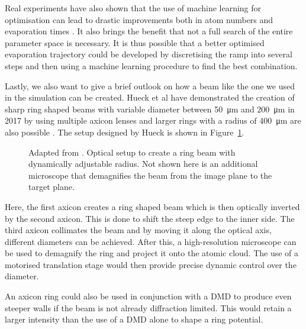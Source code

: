 Real experiments have also shown that the use of machine learning for optimisation can lead to drastic improvements both in atom numbers and evaporation times \cite{machinelearning1,machinelearning2}. It also brings the benefit that not a full search of the entire parameter space is necessary. It is thus possible that a better optimised evaporation trajectory could be developed by discretising the ramp into several steps and then using a machine learning procedure to find the best combination.

Lastly, we also want to give a brief outlook on how a beam like the one we used in the simulation can be created. Hueck et al \cite{axiconSM} have demonstrated the creation of sharp ring shaped beams with variable diameter between \SI{50}{\micro\meter} and \SI{200}{\micro\meter} in 2017 by using multiple axicon \cite{McLeod} lenses and larger rings with a radius of \SI{400}{\micro\meter} are also possible \cite{MANEK199867}.
The setup designed by Hueck is shown in Figure~\ref{fig:proposed_beam}.
\begin{figure}[htbp]
    \centering
    
    \caption[Optical setup to create a ring beam with dynamically adjustable radius]{Adapted from \cite{axiconSM}. Optical setup to create a ring beam with dynamically adjustable radius. Not shown here is an additional microscope that demagnifies the beam from the image plane to the target plane.}
    \label{fig:proposed_beam}
\end{figure}
Here, the first axicon creates a ring shaped beam which is then optically inverted by the second axicon. This is done to shift the steep edge to the inner side. The third axicon collimates the beam and by moving it along the optical axis, different diameters can be achieved. After this, a high-resolution microscope can be used to demagnify the ring and project it onto the atomic cloud.
The use of a motorised translation stage would then provide precise dynamic control over the diameter.

An axicon ring could also be used in conjunction with a DMD to produce even steeper walls if the beam is not already diffraction limited. This would retain a larger intensity than the use of a DMD alone to shape a ring potential.


